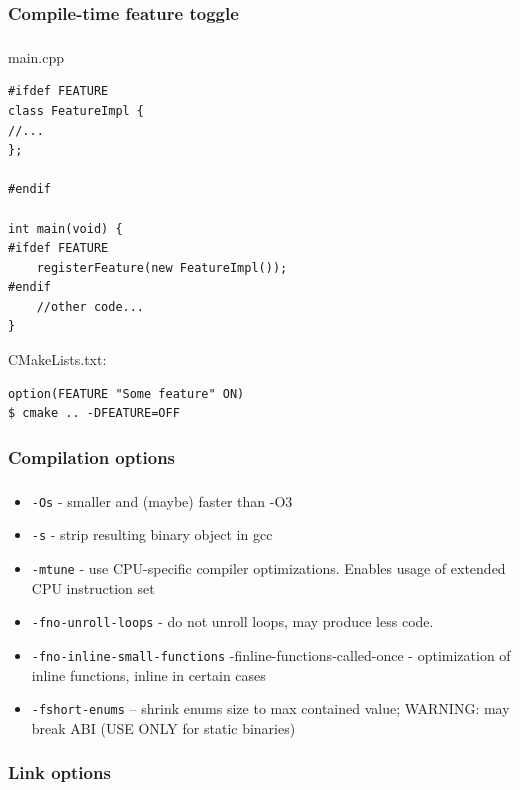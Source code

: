 \documentclass{beamer}
\newcommand{\codeinline}[1] {\texttt{\small #1}}
\begin{document}
\subsubsection{Compile-time feature toggle}

\begin{frame}[fragile]
\frametitle{\subsubsecname}
\small
\begin{multicols}{2}
main.cpp
\begin{verbatim}
#ifdef FEATURE
class FeatureImpl {
//...	
};

#endif

int main(void) {
#ifdef FEATURE
	registerFeature(new FeatureImpl());
#endif
	//other code...
}
\end{verbatim}

\columnbreak

CMakeLists.txt:
\begin{verbatim}
option(FEATURE "Some feature" ON)
$ cmake .. -DFEATURE=OFF
\end{verbatim}
\end{multicols}
\end{frame}

\subsubsection{Compilation options}

\begin{frame}
\frametitle{\subsubsecname}
\begin{itemize}
	\item \codeinline{-Os} - smaller and (maybe) faster than -O3 
	\item \codeinline{-s} - strip resulting binary object in gcc
	\item \codeinline{-mtune} - use CPU-specific compiler optimizations. Enables usage of extended CPU instruction set
	\item \codeinline{-fno-unroll-loops} - do not unroll loops, may produce less code.
	\item \codeinline{-fno-inline-small-functions} -finline-functions-called-once - optimization of inline functions, inline in certain cases
	\item \codeinline{-fshort-enums} – shrink enums size to max contained value; WARNING: may break ABI (USE ONLY for static binaries)
\end{itemize}
\end{frame}

\subsubsection{Link options}
\end{document}
